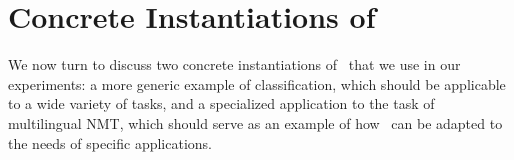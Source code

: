 \section{\label{sec:formualtion}Concrete Instantiations of \dds}

We now turn to discuss two concrete instantiations of \dds~that we use in our experiments: a more generic example of classification, which should be applicable to a wide variety of tasks, and a specialized application to the task of multilingual NMT, which should serve as an example of how \dds~can be adapted to the needs of specific applications.




